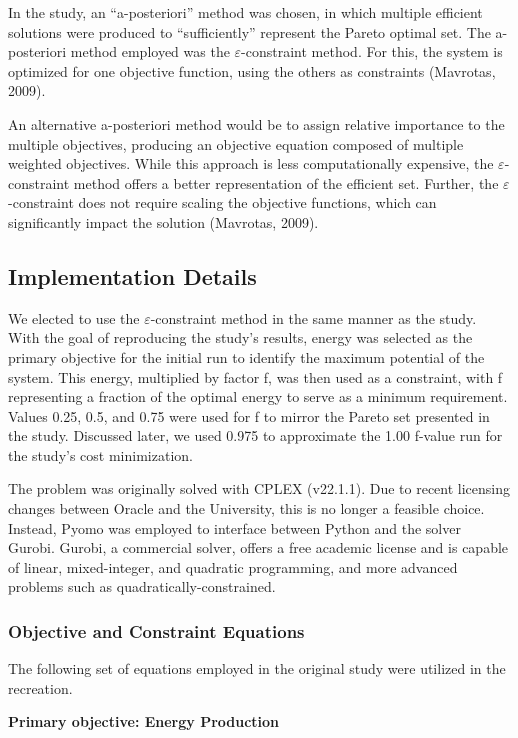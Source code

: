 \documentclass[12pt]{article}
\begin{document}
In the study, an “a-posteriori” method was chosen, in which multiple efficient solutions were produced to “sufficiently” represent the Pareto optimal set. The a-posteriori method employed was the $\varepsilon$-constraint method. For this, the system is optimized for one objective function, using the others as constraints (Mavrotas, 2009).

An alternative a-posteriori method would be to assign relative importance to the multiple objectives, producing an objective equation composed of multiple weighted objectives. While this approach is less computationally expensive, the $\varepsilon$-constraint method offers a better representation of the efficient set. Further, the $\varepsilon$-constraint does not require scaling the objective functions, which can significantly impact the solution (Mavrotas, 2009).

\subsection{Implementation Details}
We elected to use the $\varepsilon$-constraint method in the same manner as the study. With the goal of reproducing the study's results, energy was selected as the primary objective for the initial run to identify the maximum potential of the system. This energy, multiplied by factor f, was then used as a constraint, with f representing a fraction of the optimal energy to serve as a minimum requirement. Values 0.25, 0.5, and 0.75 were used for f to mirror the Pareto set presented in the study. Discussed later, we used 0.975 to approximate the 1.00 f-value run for the study's cost minimization. 
 
The problem was originally solved with CPLEX (v22.1.1). Due to recent licensing changes between Oracle and the University, this is no longer a feasible choice. Instead, Pyomo was employed to interface between Python and the solver Gurobi. Gurobi, a commercial solver, offers a free academic license and is capable of linear, mixed-integer, and quadratic programming, and more advanced problems such as quadratically-constrained.

\subsubsection{Objective and Constraint Equations}

The following set of equations employed in the original study were utilized in the recreation.

\vspace{10pt}
\textbf{Primary objective: Energy Production}
\end{document}
